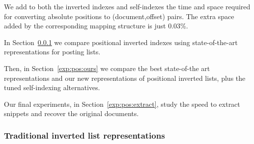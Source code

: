 \documentclass[review]{elsarticle}
\begin{document}
We add to both 
the inverted indexes and self-indexes the time and space required for 
converting absolute positions to (document,offset) pairs. 
The extra space added by the corresponding mapping structure is just 0.03\%.

In Section~\ref{exp:pos:others} we compare positional inverted indexes using 
state-of-the-art representations for posting lists. 

Then, in Section~\ref{exp:pos:ours} we compare the best
state-of-the art representations and our new representations of positional
inverted lists, plus the tuned self-indexing alternatives.


Our final experiments, in Section~\ref{exp:pos:extract}, study the speed to
extract snippets and recover the original documents.

\subsubsection{Traditional inverted list representations} \label{exp:pos:others}
\end{document}
